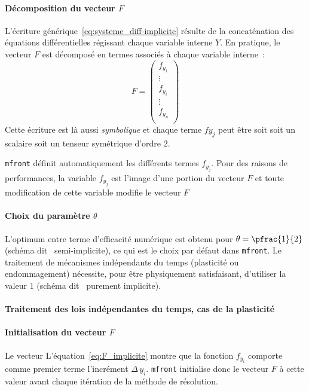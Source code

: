 \documentclass[rectoverso,pleiades,pstricks,leqno,anti]{texmf/note_technique_2010}
\newcommand{\mfront}{\texttt{mfront}}
\begin{document}
\paragraph{Décomposition du vecteur $F$} L'écriture
générique~\ref{eq:systeme_diff-implicite} résulte de la concaténation
des équations différentielles régissant chaque variable interne \(Y\).
En pratique, le vecteur \(F\) est décomposé en termes associés à chaque
variable interne~:
\[
F=
\begin{pmatrix}
  f_{y_{1}} \\
  \vdots \\
  f_{y_{i}} \\
  \vdots \\
  f_{y_{n}} \\
\end{pmatrix}
\]
Cette écriture est là aussi {\em symbolique} et chaque terme
\(f{y_{j}}\) peut être soit soit un scalaire soit un tenseur symétrique
d'ordre \(2\).

\mfront{} définit automatiquement les différents termes \(f_{y_{j}}\).
Pour des raisons de performances, la variable \(f_{y_{j}}\) est l'image
d'une portion du vecteur \(F\) et toute modification de cette variable
modifie le vecteur \(F\)

\paragraph{Choix du paramètre $\theta$}
L'optimum entre terme d'efficacité numérique est obtenu pour
\(\theta=\pfrac{1}{2}\) (schéma dit \og~semi-implicite\fg{}), ce qui est
le choix par défaut dans \mfront{}. Le traitement de mécanismes
indépendants du temps (plasticité ou endommagement) nécessite, pour être
physiquement satisfaisant, d'utiliser la valeur \(1\) (schéma dit
\og~purement implicite\fg{}).

\paragraph{Traitement des lois indépendantes du temps, cas de la
  plasticité}

\paragraph{Initialisation du vecteur $F$} Le vecteur 
L'équation~\eqref{eq:F_implicite} montre que la fonction \(f_{y_{i}}\)
comporte comme premier terme l'incrément \(\Delta\,y_{i}\). \mfront{}
initialise donc le vecteur \(F\) à cette valeur avant chaque itération
de la méthode de résolution.
\end{document}
